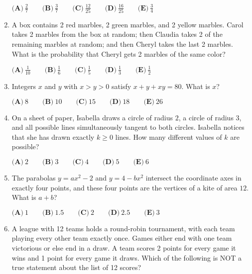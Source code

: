 \documentclass{article}
\begin{document}
\begin{enumerate}[label=\arabic*., itemsep=0.5em]
$ \textbf{(A)}\ \frac27 \qquad\textbf{(B)}\ \frac37 \qquad\textbf{(C)}\ \frac{12}{25} \qquad\textbf{(D)}\ \frac{16}{25} \qquad\textbf{(E)}\ \frac34$\par \vspace{0.5em}\item A box contains 2 red marbles, 2 green marbles, and 2 yellow marbles. Carol takes 2 marbles from the box at random; then Claudia takes 2 of the remaining marbles at random; and then Cheryl takes the last 2 marbles. What is the probability that Cheryl gets 2 marbles of the same color?

$ \textbf{(A)}\ \frac{1}{10} \qquad\textbf{(B)}\ \frac16 \qquad\textbf{(C)}\ \frac15 \qquad\textbf{(D)}\ \frac13 \qquad\textbf{(E)}\ \frac12$\par \vspace{0.5em}\item Integers $x$ and $y$ with $x>y>0$ satisfy $x+y+xy=80$. What is $x$?

$ \textbf{(A)}\ 8 \qquad\textbf{(B)}\ 10 \qquad\textbf{(C)}\ 15 \qquad\textbf{(D)}\ 18 \qquad\textbf{(E)}\ 26$\par \vspace{0.5em}\item On a sheet of paper, Isabella draws a circle of radius $2$, a circle of radius $3$, and all possible lines simultaneously tangent to both circles. Isabella notices that she has drawn exactly $k \ge 0$ lines. How many different values of $k$ are possible?

$ \textbf{(A)}\ 2 \qquad\textbf{(B)}\ 3 \qquad\textbf{(C)}\ 4 \qquad\textbf{(D)}\ 5\qquad\textbf{(E)}\ 6$\par \vspace{0.5em}\item The parabolas $y=ax^2 - 2$ and $y=4 - bx^2$ intersect the coordinate axes in exactly four points, and these four points are the vertices of a kite of area $12$. What is $a+b$?

$ \textbf{(A)}\ 1\qquad\textbf{(B)}\ 1.5\qquad\textbf{(C)}\ 2\qquad\textbf{(D)}\ 2.5\qquad\textbf{(E)}\ 3$\par \vspace{0.5em}\item A league with 12 teams holds a round-robin tournament, with each team playing every other team exactly once. Games either end with one team victorious or else end in a draw. A team scores 2 points for every game it wins and 1 point for every game it draws. Which of the following is NOT a true statement about the list of 12 scores?


\end{enumerate}
\end{document}
